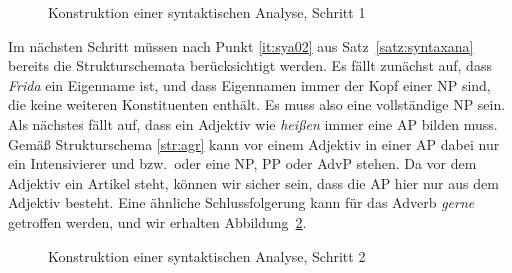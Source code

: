 \begin{figure}[!htbp]
  \caption{Konstruktion einer syntaktischen Analyse, Schritt 1}
  \label{fig:sya01}
\end{figure}

Im nächsten Schritt müssen nach Punkt \ref{it:sya02} aus Satz~\ref{satz:syntaxana} bereits die Strukturschemata berücksichtigt werden.
Es fällt zunächst auf, dass \textit{Frida} ein Eigenname ist, und dass Eigennamen immer der Kopf einer NP sind, die keine weiteren Konstituenten enthält.
Es muss also eine vollständige NP sein.
Als nächstes fällt auf, dass ein Adjektiv wie \textit{heißen} immer eine AP bilden muss.
Gemäß Strukturschema \ref{str:agr} kann vor einem Adjektiv in einer AP dabei nur ein Intensivierer und bzw.\ oder eine NP, PP oder AdvP stehen.
Da vor dem Adjektiv ein Artikel steht, können wir sicher sein, dass die AP hier nur aus dem Adjektiv besteht.
Eine ähnliche Schlussfolgerung kann für das Adverb \textit{gerne} getroffen werden, und wir erhalten Abbildung~\ref{fig:sya02}.

\begin{figure}[!htbp]
  \caption{Konstruktion einer syntaktischen Analyse, Schritt 2}
  \label{fig:sya02}
\end{figure}

